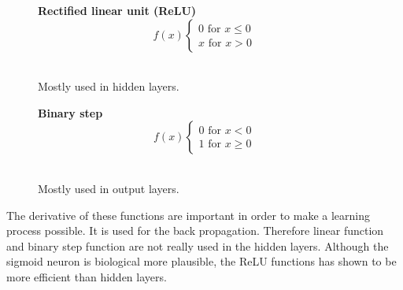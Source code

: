 \documentclass[12pt]{article}
\begin{document}
\begin{figure}[H]
\vspace{1cm}
\begin{minipage}[t]{0.5\textwidth}
\begin{center}
\textbf{Rectified linear unit (ReLU)}
\begin{equation}
f(x) \left\{\begin{matrix}
0 \text{ for } x \leq 0\\ 
x \text{ for } x >  0
\end{matrix}\right.
\end{equation}
\\
Mostly used in \glspl{hidden layer}.
\end{center}
\end{minipage}
\begin{minipage}[t]{0.5\textwidth}
\begin{center}
\textbf{Binary step}
\begin{equation}
f(x) \left\{\begin{matrix}
0 \text{ for } x < 0\\ 
1 \text{ for } x \geq 0
\end{matrix}\right.
\end{equation}
\\
Mostly used in  \glspl{output layer}.
\end{center}
\end{minipage}
\end{figure}
The derivative of these functions are important in order to make a learning process possible. It is used for the \gls{back propagation}. Therefore \gls{linear function} and \gls{binary step function} are not really used in the \glspl{hidden layer}.
Although the \gls{sigmoid neuron} is biological more plausible, the \gls{ReLU} functions has shown to be more efficient than \glspl{hidden layer}.\cite{advantages_activation} 
\end{document}
